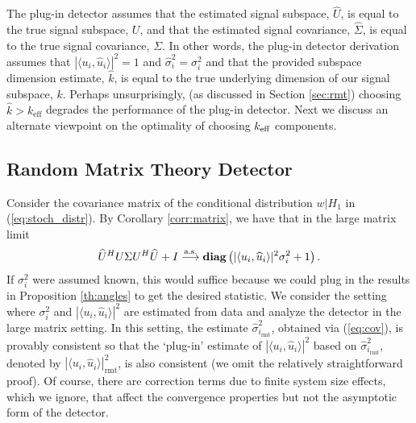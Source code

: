 The plug-in detector assumes that the estimated signal subspace, $\widehat{U}$, is equal to the true signal subspace, $U$, and that the estimated signal covariance, $\widehat{\Sigma}$, is equal to the true signal covariance, $\Sigma$. In other words,  the plug-in detector derivation assumes that $|\langle u_i,\widehat{u}_i\rangle|^2=1$ and $\widehat{\sigma}_i^2=\sigma_i^2$ and that the provided subspace dimension estimate, $\widehat{k}$, is equal to the true underlying dimension of our signal subspace, $k$. Perhaps unsurprisingly, (as discussed in Section \ref{sec:rmt}) choosing $\widehat{k} > k_\text{eff}$ degrades the performance of the plug-in detector. Next we discuss an alternate viewpoint on the optimality of choosing $k_\text{eff}$ components.

\subsection{Random Matrix Theory Detector}\label{sec:optimal_stoch}
Consider the covariance matrix of the conditional distribution $w|H_1$ in (\ref{eq:stoch_distr}). By Corollary \ref{corr:matrix}, we have that in the large matrix limit
\begin{equation}\label{eq:cov mat}
\widehat{U}^HU\Sigma U^H\widehat{U}+I \convas \diag\left(|\langle u_i,\widehat{u}_i\rangle|^2\sigma_i^2 + 1\right).
\end{equation}
If $\sigma_i^{2}$ were assumed known, this would suffice because we could plug in the results in Proposition \ref{th:angles} to get the desired statistic. We consider the setting where $\sigma_i^{2}$ and $|\langle u_i,\widehat{u}_i\rangle|^2$ are estimated from data and analyze the detector in the large matrix setting. In this setting, the estimate $\widehat{\sigma}_{i_\text{rmt}}^2$,  obtained via (\ref{eq:cov}), is provably consistent so that the `plug-in' estimate of $|\langle u_i,\widehat{u}_i\rangle|^2$ based on $\widehat{\sigma}_{i_\text{rmt}}^2$, denoted by $|\langle u_i,\widehat{u}_i\rangle|^2_\text{rmt}$, is also consistent (we omit the relatively straightforward proof). Of course, there are correction terms due to finite system size effects, which we ignore, that affect the convergence properties but not the asymptotic form of the detector.



